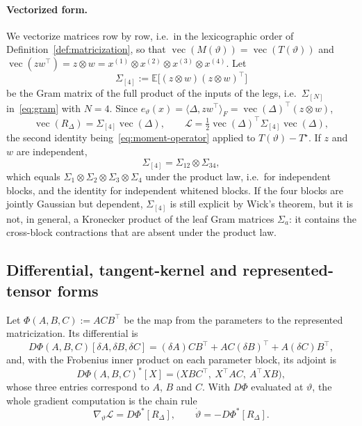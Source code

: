 \documentclass[11pt]{article}
\newcommand{\E}{\mathbb{E}}
\newcommand{\vect}{\operatorname{vec}}
\newcommand{\ip}[2]{\langle #1,#2\rangle}
\theoremstyle{definition}
\numberwithin{equation}{section}
\begin{document}
\paragraph{Vectorized form.}
We vectorize matrices row by row, i.e.\ in the lexicographic order of Definition~\ref{def:matricization}, so that $\vect(M(\vartheta))=\vect(T(\vartheta))$ and $\vect(zw^\top)=z\otimes w=x^{(1)}\otimes x^{(2)}\otimes x^{(3)}\otimes x^{(4)}$. Let
\begin{equation}\label{eq:d2-feature-gram}
\Sigma_{[4]}:=\E\big[(z\otimes w)(z\otimes w)^\top\big]
\end{equation}
be the Gram matrix of the full product of the inputs of the legs, i.e.\ $\Sigma_{[N]}$ in~\eqref{eq:gram} with $N=4$. Since $e_\vartheta(x)=\ip{\Delta}{zw^\top}_F=\vect(\Delta)^\top(z\otimes w)$,
\begin{equation}\label{eq:d2-vectorized-loss}
\vect(R_\Delta)=\Sigma_{[4]}\vect(\Delta),\qquad\mathcal L=\tfrac12\vect(\Delta)^\top\Sigma_{[4]}\vect(\Delta),
\end{equation}
the second identity being~\eqref{eq:moment-operator} applied to $T(\vartheta)-T^\star$. If $z$ and $w$ are independent,
\begin{equation}\label{eq:d2-gamma-product}
\Sigma_{[4]}=\Sigma_{12}\otimes\Sigma_{34},
\end{equation}
which equals $\Sigma_1\otimes\Sigma_2\otimes\Sigma_3\otimes\Sigma_4$ under the product law, i.e.\ for independent blocks, and the identity for independent whitened blocks. If the four blocks are jointly Gaussian but dependent, $\Sigma_{[4]}$ is still explicit by Wick's theorem, but it is not, in general, a Kronecker product of the leaf Gram matrices $\Sigma_a$: it contains the cross-block contractions that are absent under the product law.

\subsection{Differential, tangent-kernel and represented-tensor forms}\label{sec:d2-operator}

Let $\Phi(A,B,C):=ACB^\top$ be the map from the parameters to the represented matricization. Its differential is
\begin{equation}\label{eq:d2-DPhi}
D\Phi(A,B,C)[\delta A,\delta B,\delta C]=(\delta A)CB^\top+AC(\delta B)^\top+A(\delta C)B^\top,
\end{equation}
and, with the Frobenius inner product on each parameter block, its adjoint is
\begin{equation}\label{eq:d2-DPhi-adjoint}
D\Phi(A,B,C)^*[X]=\big(XBC^\top,\ X^\top AC,\ A^\top XB\big),
\end{equation}
whose three entries correspond to $A$, $B$ and $C$. With $D\Phi$ evaluated at $\vartheta$, the whole gradient computation is the chain rule
\begin{equation}\label{eq:d2-compact-chain-rule}
\nabla_\vartheta\mathcal L=D\Phi^*[R_\Delta],\qquad\dot\vartheta=-D\Phi^*[R_\Delta].
\end{equation}
\end{document}
